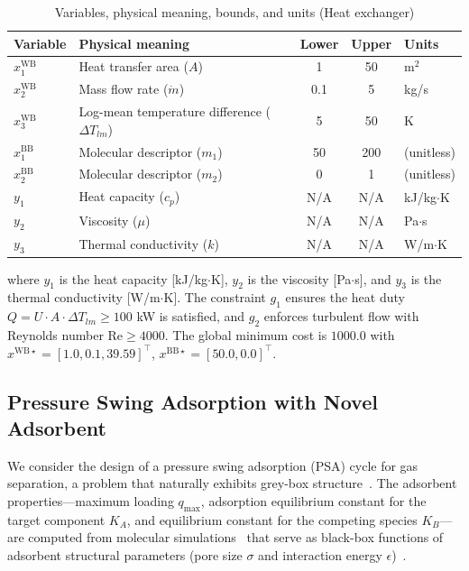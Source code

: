 \documentclass[12pt,a4paper]{article}%
\theoremstyle{plain}%
\theoremstyle{remark}%
\theoremstyle{definition}%
\def\WB{\mathrm{WB}}
\def\BB{\mathrm{BB}}
\begin{document}
\begin{appendices}
\begin{table}[htbp]
\centering
\caption{Variables, physical meaning, bounds, and units (Heat exchanger)}
\label{tab:heat_exchanger_vars}
\begin{tabular}{@{}llccl@{}}
\toprule
Variable & Physical meaning & Lower & Upper & Units \\
\midrule
$x^{\WB}_1$ & Heat transfer area ($A$) & 1 & 50 & m$^2$ \\
$x^{\WB}_2$ & Mass flow rate ($\dot{m}$) & 0.1 & 5 & kg/s \\
$x^{\WB}_3$ & Log-mean temperature difference ($\Delta T_{lm}$) & 5 & 50 & K \\
\midrule
$x^{\BB}_1$ & Molecular descriptor ($m_1$) & 50 & 200 & (unitless) \\
$x^{\BB}_2$ & Molecular descriptor ($m_2$) & 0 & 1 & (unitless) \\
\midrule
$y_1$ & Heat capacity ($c_p$) & N/A & N/A & kJ/kg$\cdot$K \\
$y_2$ & Viscosity ($\mu$) & N/A & N/A & Pa$\cdot$s \\
$y_3$ & Thermal conductivity ($k$) & N/A & N/A & W/m$\cdot$K \\
\bottomrule
\end{tabular}
\end{table}

where $y_1$ is the heat capacity [kJ/kg$\cdot$K], $y_2$ is the viscosity [Pa$\cdot$s], and $y_3$ is the thermal conductivity [W/m$\cdot$K]. The constraint $g_1$ ensures the heat duty $Q = U \cdot A \cdot \Delta T_{lm} \geq 100$ kW is satisfied, and $g_2$ enforces turbulent flow with Reynolds number $\text{Re} \geq 4000$. The global minimum cost is $1000.0$ with $x^{\WB\star} = [1.0, 0.1, 39.59]^\top$, $x^{\BB\star} = [50.0, 0.0]^\top$.

\subsection{Pressure Swing Adsorption with Novel Adsorbent}\label{subsec:app_psa}

We consider the design of a pressure swing adsorption (PSA) cycle for gas separation, a problem that naturally exhibits grey-box structure~\cite{boukouvala2017argonaut,agarwal2010superstructure,ruthven1994psa}. The adsorbent properties---maximum loading $q_{\max}$, adsorption equilibrium constant for the target component $K_A$, and equilibrium constant for the competing species $K_B$---are computed from molecular simulations~\cite{burns2020process,smit2008molecular} that serve as black-box functions of adsorbent structural parameters (pore size $\sigma$ and interaction energy $\epsilon$)~\cite{dubbeldam2019force}.


\end{appendices}
\end{document}

